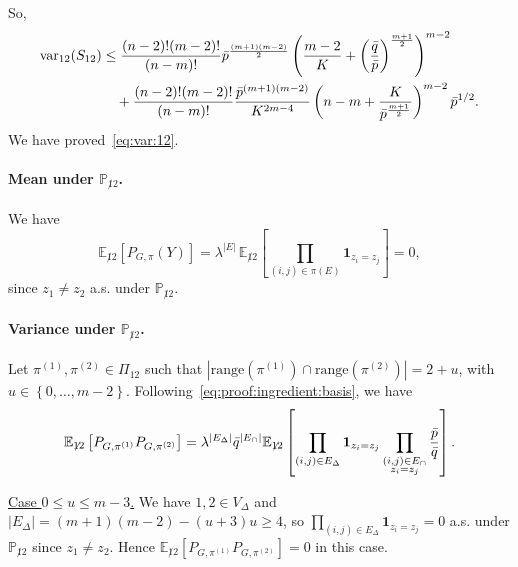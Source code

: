 \documentclass[final]{colt2026}
\newcommand{\1}{\mathbf{1}}
\newcommand{\bbE}{\mathbb{E}}
\newcommand{\bbP}{\mathbb{P}}
\newcommand{\pa}[1]{\left(#1\right)}
\newcommand{\ac}[1]{\left\{#1\right\}}
\newcommand{\cro}[1]{\left[#1\right]}
\begin{document}
So,
\begin{align*}
 \text{var}_{12}(S_{12}) & \leq {(n-2)! (m-2)!\over (n-m)!} \bar p^{(m+1)(m-2)\over 2} \pa{{m-2 \over K}+\pa{\bar q\over \bar p}^{{m+1\over 2}}}^{m-2} \\
&\quad +{(n-2)!(m-2)!\over (n-m)!}{\bar p^{(m+1)(m-2)} \over K^{2m-4}}\pa{n-m+{K\over \bar p^{m+1\over 2}}}^{m-2}\bar p^{1/2}.
\end{align*}
We have proved~\eqref{eq:var:12}. 


\paragraph{Mean under $\bbP_{\not 12}$.}
We have
\begin{equation*}
\bbE_{\not 12}\cro{P_{G,\pi}(Y)}= \lambda^{|E|} \,\bbE_{\not 12}\cro{\prod_{(i,j)\in \pi(E)}\mathbf 1_{z_{i}=z_{j}}}=0,
\end{equation*}
since $z_{1}\neq z_{2}$ a.s. under  $\bbP_{\not 12}$. 



\paragraph{Variance under $\bbP_{\not 12}$.}
Let $\pi^{(1)},\pi^{(2)}\in \Pi_{12}$ such that $|\text{range}(\pi^{(1)})\cap \text{range}(\pi^{(2)})|=2+u$, with $u\in \ac{0,\ldots,m-2}$. Following~\eqref{eq:proof:ingredient:basis}, we have 
$$\bbE_{\not 12}\cro{P_{G,\pi^{(1)}}P_{G,\pi^{(2)}}}=\lambda^{|E_{\Delta}|} \bar q^{|E_{\cap}|} \bbE_{\not 12}\cro{\prod_{(i,j)\in E_{\Delta}}\mathbf 1_{z_{i}=z_{j}}\prod_{\substack{(i,j)\in E_{\cap}\\ z_{i}=z_{j}}}{\bar p\over \bar q}}.$$
\smallskip



\noindent\underline{Case $0\leq u\leq m-3$.}
We have $1,2\in V_{\Delta}$ and $|E_{\Delta}|=(m+1)(m-2)-(u+3)u\geq 4$, so 
$\prod_{(i,j)\in E_{\Delta}}\mathbf 1_{z_{i}=z_{j}}=0$ a.s. under $\bbP_{\not 12}$ since 
 $z_{1}\neq z_{2}$.
 Hence $\bbE_{\not 12}\cro{P_{G,\pi^{(1)}}P_{G,\pi^{(2)}}}=0$ in this case.
 \smallskip
\end{document}

